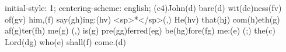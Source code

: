 initial-style: 1;
centering-scheme: english;
(c4)John(d) bare(d) wit(dc)ness(fv) of(gv) him,(f) say(gh)ing:(hv) <sp>*</sp>(,) He(hv) that(hj) com(h)eth(g) af(g)ter(fh) me(g) (,) is(g) pre(gg)ferred(eg) be(hg)fore(fg) me:(e) (;) the(c) Lord(dg) who(e) shall(f) come.(d)
